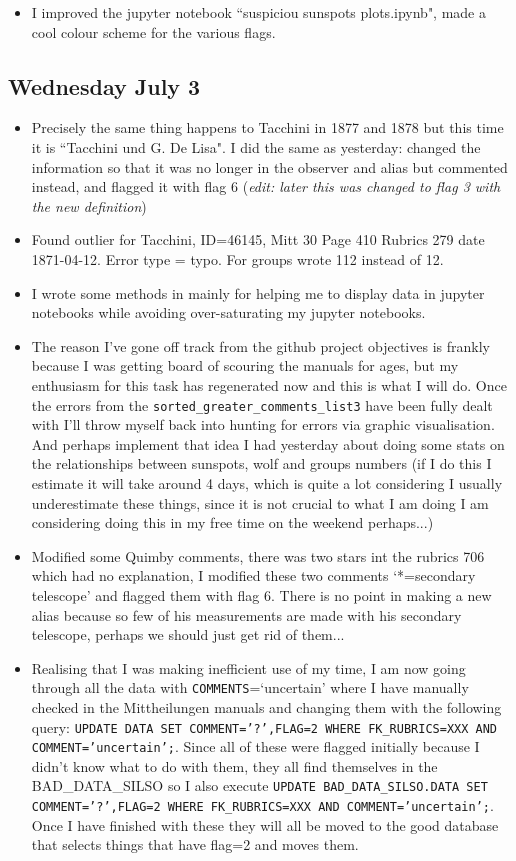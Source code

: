 \documentclass[12pt]{article}
\begin{document}
\begin{itemize}
\item I improved the jupyter notebook ``suspiciou sunspots plots.ipynb", made a cool colour scheme for the various flags.
\end{itemize}
    
\subsection{Wednesday July 3}\label{wed 3 jul}
\begin{itemize}
    \item Precisely the same thing happens to Tacchini in 1877 and 1878 but this time it is ``Tacchini und G. De Lisa". I did the same as yesterday: changed the information so that it was no longer in the observer and alias but commented instead, and flagged it with flag 6 (\textit{edit: later this was changed to flag 3 with the new definition})
    \item Found outlier for Tacchini, ID=46145, Mitt 30 Page 410 Rubrics 279 date 1871-04-12. Error type = typo. For groups wrote 112 instead of 12. 
    \item I wrote some methods in  mainly for helping me to display data in jupyter notebooks while avoiding over-saturating my jupyter notebooks.
    \item The reason I've gone off track from the github project objectives is frankly because I was getting board of scouring the manuals for ages, but my enthusiasm for this task has regenerated now and this is what I will do. Once the errors from the \texttt{sorted\_greater\_comments\_list3} have been fully dealt with I'll throw myself back into hunting for errors via graphic visualisation. And perhaps implement that idea I had yesterday about doing some stats on the relationships between sunspots, wolf and groups numbers (if I do this I estimate it will take around 4 days, which is quite a lot considering I usually underestimate these things, since it is not crucial to what I am doing I am considering doing this in my free time on the weekend perhaps...)
    \item Modified some Quimby comments, there was two stars int the rubrics 706 which had no explanation, I modified these two comments `*=secondary telescope' and flagged them with flag 6. There is no point in making a new alias because so few of his measurements are made with his secondary telescope, perhaps we should just get rid of them...
    \item Realising that I was making inefficient use of my time, I am now going through all the data with \texttt{COMMENTS}=`uncertain' where I have manually checked in the Mittheilungen manuals and changing them with the following query: \texttt{UPDATE DATA SET COMMENT='?',FLAG=2 WHERE FK\_RUBRICS=XXX AND COMMENT='uncertain';}. Since all of these were flagged initially because I didn't know what to do with them, they all find themselves in the BAD\_DATA\_SILSO so I also execute \texttt{UPDATE BAD\_DATA\_SILSO.DATA SET COMMENT='?',FLAG=2 WHERE FK\_RUBRICS=XXX AND COMMENT='uncertain';}. Once I have finished with these they will all be moved to the good database that selects things that have flag=2 and moves them.

\end{itemize}
\end{document}
